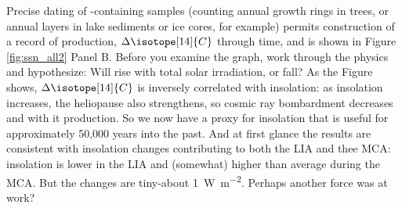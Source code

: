 Precise dating of -containing samples (counting annual growth rings in trees, or annual layers in lake sediments or ice cores, for example) permits construction of a record of  production, $\Delta\isotope[14]{C}$ through time, and is shown in Figure \ref{fig:ssn_all2} Panel B. Before you examine the graph, work through the physics and hypothesize: Will  rise with total solar irradiation, or fall? As the Figure shows, $\Delta\isotope[14]{C}$ is inversely correlated with insolation: as insolation increases, the heliopause also strengthens, so cosmic ray bombardment decreases and with it  production. So we now have a proxy for insolation that is useful for approximately 50,000 years into the past. And at first glance the results are consistent with insolation changes contributing to both the LIA and thee MCA: insolation is lower in the LIA and (somewhat) higher than average during the MCA. But the changes are tiny-about \SI{1}{\watt\per\metre\squared}. Perhaps another force was at work? 

